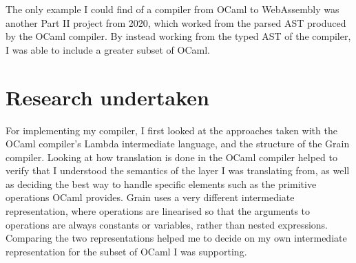 The only example I could find of a compiler from OCaml to WebAssembly was another Part II project from 2020, which worked from the parsed AST produced by the OCaml compiler. By instead working from the typed AST of the compiler, I was able to include a greater subset of OCaml.


\section{Research undertaken}
For implementing my compiler, I first looked at the approaches taken with the OCaml compiler's Lambda intermediate language, and the structure of the Grain compiler. Looking at how translation is done in the OCaml compiler helped to verify that I understood the semantics of the layer I was translating from, as well as deciding the best way to handle specific elements such as the primitive operations OCaml provides. Grain uses a very different intermediate representation, where operations are linearised so that the arguments to operations are always constants or variables, rather than nested expressions. Comparing the two representations helped me to decide on my own intermediate representation for the subset of OCaml I was supporting.


